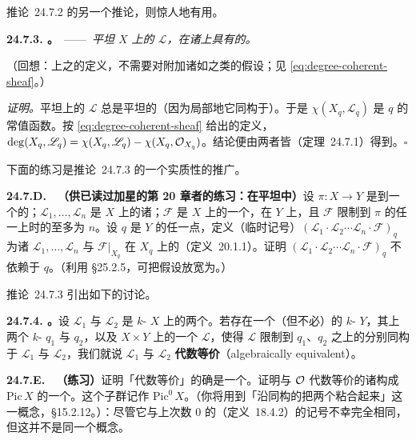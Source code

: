 \mbox{推论~24.7.2} 的另一个推论，则惊人地有用。

\textbf{24.7.3. \trhCorollary。}\ ——\ \emph{平坦\trProjective{}\trCurve{}\trFamily{} $X$ 上的\trInvertibleSheaf{} $\mathscr{L}$，在诸\trFiber{}上具有\trLocallyConstant{}的\trDegree。}

（回想：\trProjective{}\trCurve{}上\trLineBundle{}之\trDegree{}的定义，不需要对\trCurve{}附加诸如\trRegularity{}之类的假设；见 \eqref{eq:degree-coherent-sheaf}。）

\emph{证明。}\quad 平坦\trCurve{}\trFamily{}上的\trInvertibleSheaf{} $\mathscr{L}$ 总是平坦的（因为局部地它同构于\trStructureSheaf）。于是 $\chi(X_q,\mathscr{L}_q)$ 是 $q$ 的常值函数。按 \eqref{eq:degree-coherent-sheaf} 给出的\trDegree{}定义，$\deg(X_q,\mathscr{L}_q)=\chi(X_q,\mathscr{L}_q)-\chi(X_q,\mathcal{O}_{X_q})$。结论便由两者皆\trLocallyConstant（\mbox{定理~24.7.1}）得到。\hfill$\square$

下面的练习是\mbox{推论~24.7.3} 的一个实质性的推广。

\textbf{24.7.D.}\ \hard\ \textbf{（供已读过加星的第 20 章者的练习：\trIntersectionNumber{}在平坦\trFamily{}中\trLocallyConstant）}\quad 设 $\pi\colon X\to Y$ 是到一个\trConnected\trScheme{}的\trFlat\trProjective{}\trMorphism；$\mathscr{L}_1,\dots,\mathscr{L}_n$ 是 $X$ 上的诸\trLineBundle；$\mathscr{F}$ 是 $X$ 上的一个\trCoherentSheaf，在 $Y$ 上\trFlat，且 $\mathscr{F}$ 限制到 $\pi$ 的任一\trFiber{}上时\trSupport{}的\trDimension{}至多为 $n$。设 $q$ 是 $Y$ 的任一点，定义（临时记号）$(\mathscr{L}_1\cdot\mathscr{L}_2\cdots\mathscr{L}_n\cdot\mathscr{F})_q$ 为诸 $\mathscr{L}_1,\dots,\mathscr{L}_n$ 与 $\mathscr{F}|_{X_q}$ 在\trFiber{} $X_q$ 上的\trIntersection（\mbox{定义~20.1.1}）。证明 $(\mathscr{L}_1\cdot\mathscr{L}_2\cdots\mathscr{L}_n\cdot\mathscr{F})_q$ 不依赖于 $q$。（利用 \S25.2.5，可把\trProjective{}假设放宽为\trProperness。）

\mbox{推论~24.7.3} 引出如下的讨论。

\textbf{24.7.4. \trhDefinition。}\quad 设 $\mathscr{L}_1$ 与 $\mathscr{L}_2$ 是 $k$-\trVariety{} $X$ 上的两个\trLineBundle。若存在一个\trConnected（但不必\trIrreducible）的 $k$-\trVariety{} $Y$，其上两个 $k$-\trValuedPoint{} $q_1$ 与 $q_2$，以及 $X\times Y$ 上的一个\trLineBundle{} $\mathscr{L}$，使得 $\mathscr{L}$ 限制到 $q_1$、$q_2$ 之上的\trFiber{}分别同构于 $\mathscr{L}_1$ 与 $\mathscr{L}_2$，我们就说 $\mathscr{L}_1$ 与 $\mathscr{L}_2$ \textbf{代数等价}（algebraically equivalent）。

\textbf{24.7.E.}\ \hard\ \textbf{（练习）}\quad 证明「代数等价」的确是一个\trEquivalenceRelation。证明与 $\mathcal{O}$ 代数等价的诸\trLineBundle{}构成 $\mathrm{Pic}\,X$ 的一个\trSubgroup。这个子群记作 $\mathrm{Pic}^0\,X$。（你将用到「沿同构的\trClosedSubscheme{}把两个\trScheme{}粘合起来」这一概念，\S15.2.12。）\trhWarning{}：尽管它与\trCurve{}上次数 $0$ 的\trLineBundle（\mbox{定义~18.4.2}）的记号不幸完全相同，但这并不是同一个概念。

